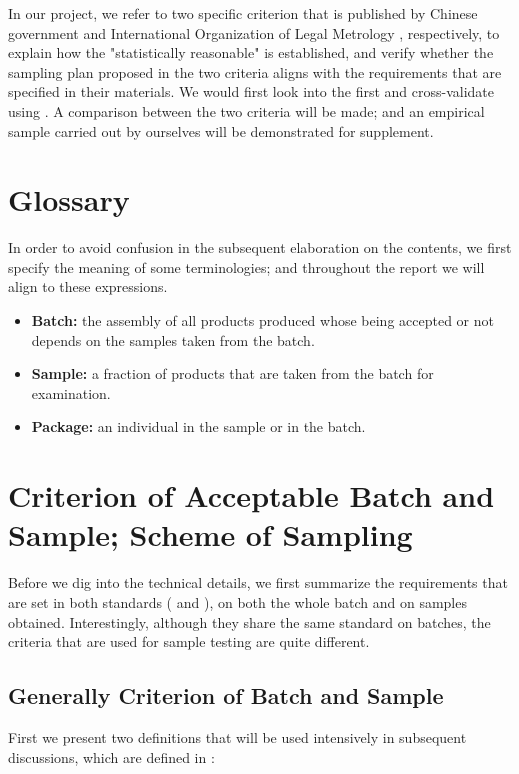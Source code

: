 \documentclass[12pt]{article}
\begin{document}
In our project, we refer to two specific criterion that is published by Chinese government \cite{JJF2005} and International Organization of Legal Metrology \cite{OIML2016}, respectively, to explain how the "statistically reasonable" is established, and verify whether the sampling plan proposed in the two criteria aligns with the requirements that are specified in their materials. We would first look into the \cite{JJF2005} first and cross-validate using \cite{OIML2016}. A comparison between the two criteria will be made; and an empirical sample carried out by ourselves will be demonstrated for supplement. 

\section{Glossary}

In order to avoid confusion in the subsequent elaboration on the contents, we first specify the meaning of some terminologies; and throughout the report we will align to these expressions.

\begin{itemize}
	\item \textbf{Batch:} the assembly of all products produced whose being accepted or not depends on the samples taken from the batch.
	\item \textbf{Sample:} a fraction of products that are taken from the batch for examination. 
	\item \textbf{Package:} an individual in the sample or in the batch.
\end{itemize}

\section{Criterion of Acceptable Batch and Sample; Scheme of Sampling}

Before we dig into the technical details, we first summarize the requirements that are set in both standards (\cite{JJF2005} and \cite{OIML2016}), on both the whole batch and on samples obtained. Interestingly, although they share the same standard on batches, the criteria that are used for sample testing are quite different.

\subsection{Generally Criterion of Batch and Sample}

First we present two definitions that will be used intensively in subsequent discussions, which are defined in \cite{OIML2016}:
\end{document}

